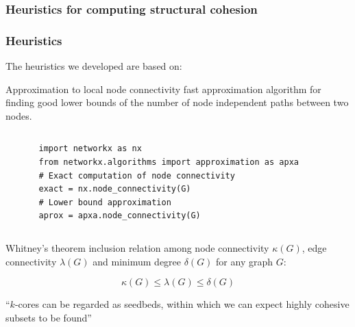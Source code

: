 \documentclass[ignorenonframetext,red,8pt,notes=show]{beamer}
\begin{document}
\subsubsection{Heuristics for computing structural cohesion}

\begin{frame}[fragile]
\frametitle{Heuristics}

The heuristics we developed are based on:

\begin{block}{Approximation to local node connectivity}
\citet{white:2001b} fast approximation algorithm for finding good lower bounds of the number of node independent paths between two nodes.

\begin{columns}[c]
\begin{column}{0.1\textwidth}

\end{column}

\begin{column}{0.8\textwidth}
\begin{scriptsize}
\begin{lstlisting}
import networkx as nx
from networkx.algorithms import approximation as apxa
# Exact computation of node connectivity
exact = nx.node_connectivity(G)
# Lower bound approximation
aprox = apxa.node_connectivity(G)
\end{lstlisting}
\end{scriptsize}
\end{column}

\begin{column}{0.1\textwidth}

\end{column}
\end{columns}
\end{block}

\begin{block}{Whitney's theorem}
inclusion relation among node connectivity $\kappa(G)$, edge connectivity $\lambda(G)$ and minimum degree $\delta(G)$ for any graph $G$:

\begin{equation*}
\kappa(G) \le \lambda(G) \le \delta(G)
\end{equation*}

``$k$-cores can be regarded as seedbeds, within which we can expect highly cohesive subsets to be found'' \citet[281]{seidman:1983}
\end{block}
\end{frame}
\end{document}
